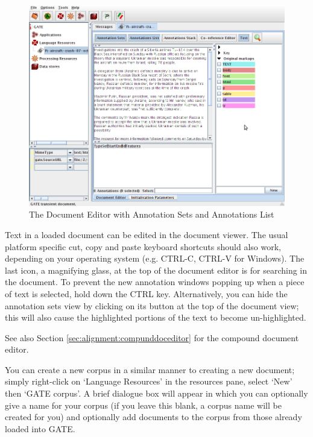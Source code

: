 \begin{figure}[!htb]
\begin{center}
\includegraphics[width=14cm]{document-editor-with-annotations.png}
\end{center}
\caption{The Document Editor with Annotation Sets and Annotations List}
\label{fig:document-editor-with-annotations}
\end{figure}

Text in a loaded document can be edited in the document viewer. The usual
platform specific cut, copy and paste keyboard shortcuts should also work,
depending on your operating system (e.g. CTRL-C, CTRL-V for Windows). The
last icon, a magnifying glass, at the top of the document editor is for
searching in the document. To prevent the new annotation windows popping up
when a piece of text is selected, hold down the CTRL key. Alternatively, you 
can hide the annotation sets view by clicking on its button at the top of the
document view; this will also cause the highlighted portions of the text
to become un-highlighted.

See also Section \ref{sec:alignment:compunddoceditor} for the compound
document editor.

\label{sec:developer:corpuspopulate}

You can create a new corpus in a similar manner to creating a new document;
simply right-click on `Language Resources' in the resources pane, select `New'
then `GATE corpus'. A brief dialogue box will appear in which you can
optionally give a name for your corpus (if you leave this blank, a corpus name
will be created for you) and optionally add documents to the corpus from those
already loaded into GATE.

